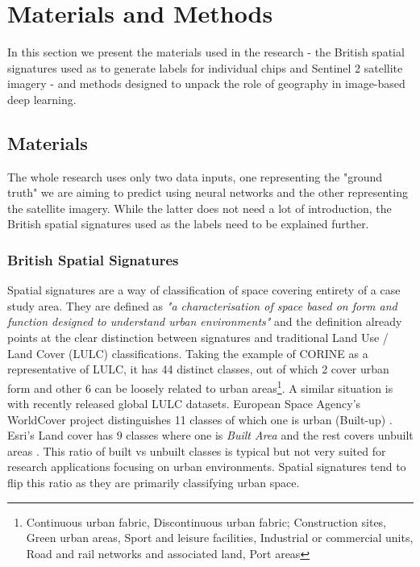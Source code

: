 \section{Materials and Methods}
\label{sec:matmet}

In this section we present the materials used in the research - the British spatial
signatures used as to generate labels for individual chips and Sentinel 2 satellite
imagery - and methods designed to unpack the role of geography in image-based deep
learning.

\subsection{Materials}

The whole research uses only two data inputs, one representing the "ground truth" we are
aiming to predict using neural networks and the other representing the satellite
imagery. While the latter does not need a lot of introduction, the British spatial
signatures used as the labels need to be explained further.

\subsubsection{British Spatial Signatures}

Spatial signatures are a way of classification of space covering entirety of a case
study area. They are defined as \textit{"a characterisation of space based on form and
function designed to understand urban environments"} \citep{dab_mf_2021a} and the
definition already points at the clear distinction between signatures and traditional
Land Use / Land Cover (LULC) classifications. Taking the example of CORINE
\citep{europeanenvironmentagency1990} as a representative of LULC, it has 44 distinct
classes, out of which 2 cover urban form and other 6 can be loosely related to urban
areas\footnote{Continuous urban fabric, Discontinuous urban fabric; Construction sites,
Green urban areas, Sport and leisure facilities, Industrial or commercial units, Road
and rail networks and associated land, Port areas}. A similar situation is with recently
released global LULC datasets. European Space Agency's WorldCover project distinguishes
11 classes of which one is urban (Built-up) \citep{zanaga_daniele_2021_5571936}. Esri's
Land cover has 9 classes where one is \textit{Built Area} and the rest covers unbuilt
areas \citep{karra2021global}. This ratio of built vs unbuilt classes is typical but not
very suited for research applications focusing on urban environments. Spatial signatures
tend to flip this ratio as they are primarily classifying urban space.

